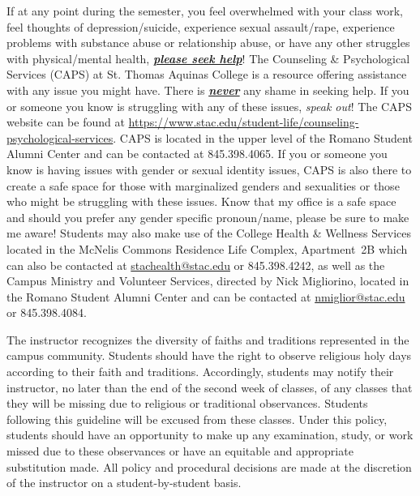 \documentclass[11pt,letterpaper]{article}
\begin{document}
If at any point during the semester, you feel overwhelmed with your class work, feel thoughts of depression/suicide, experience sexual assault/rape, experience problems with substance abuse or relationship abuse, or have any other struggles with physical/mental health, \underline{\bfseries\itshape please seek help}! The Counseling \& Psychological Services (CAPS) at St. Thomas Aquinas College is a resource offering assistance with any issue you might have. There is \underline{\bfseries\itshape never} any shame in seeking help. If you or someone you know is struggling with any of these issues, {\itshape speak out}! The CAPS website can be found at \href{https://www.stac.edu/student-life/counseling-psychological-services}{https://www.stac.edu/student-life/counseling-psychological-services}. CAPS is located in the upper level of the Romano Student Alumni Center and can be contacted at 845.398.4065. If you or someone you know is having issues with gender or sexual identity issues, CAPS is also there to create a safe space for those with marginalized genders and sexualities or those who might be struggling with these issues. Know that my office is a safe space and should you prefer any gender specific pronoun/name, please be sure to make me aware! Students may also make use of the College Health \& Wellness Services located in the McNelis Commons Residence Life Complex, Apartment~2B which can also be contacted at \href{mailto:stachealth@stac.edu}{stachealth@stac.edu} or 845.398.4242, as well as the Campus Ministry and Volunteer Services, directed by Nick Migliorino, located in the Romano Student Alumni Center and can be contacted at \href{mailto:nmiglior@stac.edu}{nmiglior@stac.edu} or 845.398.4084.
\sectionbreak



The instructor recognizes the diversity of faiths and traditions represented in the campus community. Students should have the right to observe religious holy days according to their faith and traditions. Accordingly, students may notify their instructor, no later than the end of the second week of classes, of any classes that they will be missing due to religious or traditional observances. Students following this guideline will be excused from these classes. Under this policy, students should have an opportunity to make up any examination, study, or work missed due to these observances or have an equitable and appropriate substitution made. All policy and procedural decisions are made at the discretion of the instructor on a student-by-student basis. 
\sectionbreak
\end{document}
